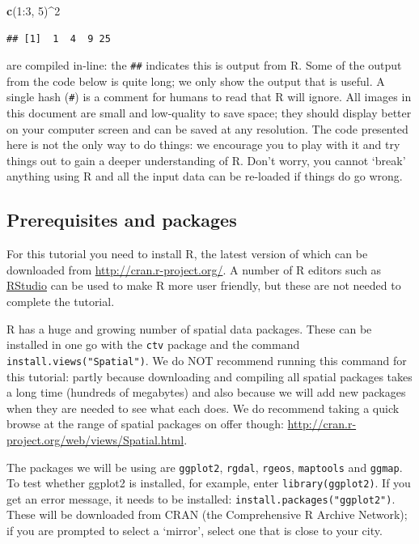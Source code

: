 \documentclass[]{article}
\newenvironment{Shaded}{}{}
\newcommand{\KeywordTok}[1]{\textcolor[rgb]{0.00,0.44,0.13}{\textbf{{#1}}}}
\newcommand{\DecValTok}[1]{\textcolor[rgb]{0.25,0.63,0.44}{{#1}}}
\newcommand{\NormalTok}[1]{{#1}}
\begin{document}
\begin{Shaded}
\begin{Highlighting}[]
\KeywordTok{c}\NormalTok{(}\DecValTok{1}\NormalTok{:}\DecValTok{3}\NormalTok{, }\DecValTok{5}\NormalTok{)^}\DecValTok{2}
\end{Highlighting}
\end{Shaded}
\begin{verbatim}
## [1]  1  4  9 25
\end{verbatim}
are compiled in-line: the \texttt{\#\#} indicates this is output from R.
Some of the output from the code below is quite long; we only show the
output that is useful. A single hash (\texttt{\#}) is a comment for
humans to read that R will ignore. All images in this document are small
and low-quality to save space; they should display better on your
computer screen and can be saved at any resolution. The code presented
here is not the only way to do things: we encourage you to play with it
and try things out to gain a deeper understanding of R. Don't worry, you
cannot `break' anything using R and all the input data can be re-loaded
if things do go wrong.

\subsection{Prerequisites and packages}

For this tutorial you need to install R, the latest version of which can
be downloaded from
\href{http://cran.r-project.org/}{http://cran.r-project.org/}. A number
of R editors such as \href{http://www.rstudio.com/}{RStudio} can be used
to make R more user friendly, but these are not needed to complete the
tutorial.

R has a huge and growing number of spatial data packages. These can be
installed in one go with the \texttt{ctv} package and the command
\texttt{install.views("Spatial")}. We do NOT recommend running this
command for this tutorial: partly because downloading and compiling all
spatial packages takes a long time (hundreds of megabytes) and also
because we will add new packages when they are needed to see what each
does. We do recommend taking a quick browse at the range of spatial
packages on offer though:
\href{http://cran.r-project.org/web/views/Spatial.html}{http://cran.r-project.org/web/views/Spatial.html}.

The packages we will be using are \texttt{ggplot2}, \texttt{rgdal},
\texttt{rgeos}, \texttt{maptools} and \texttt{ggmap}. To test whether
ggplot2 is installed, for example, enter \texttt{library(ggplot2)}. If
you get an error message, it needs to be installed:
\texttt{install.packages("ggplot2")}. These will be downloaded from CRAN
(the Comprehensive R Archive Network); if you are prompted to select a
`mirror', select one that is close to your city.
\end{document}
